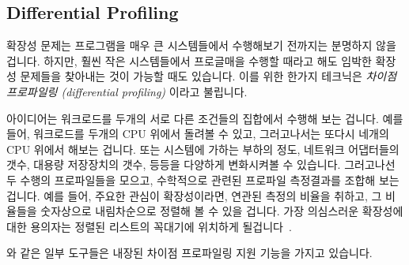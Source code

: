 \subsection{Differential Profiling}
\label{sec:debugging:Differential Profiling}

확장성 문제는 프로그램을 매우 큰 시스템들에서 수행해보기 전까지는 분명하지 않을
겁니다.
하지만, 훨씬 작은 시스템들에서 프로글매을 수행할 때라고 해도 임박한 확장성
문제들을 찾아내는 것이 가능할 때도 있습니다.
이를 위한 한가지 테크닉은 \emph{차이점 프로파일링 (differential profiling)}
이라고 불립니다.

아이디어는 워크로드를 두개의 서로 다른 조건들의 집합에서 수행해 보는 겁니다.
예를들어, 워크로드를 두개의 CPU 위에서 돌려볼 수 있고, 그러고나서는 또다시
네개의 CPU 위에서 해보는 겁니다.
또는 시스템에 가하는 부하의 정도, 네트워크 어댑터들의 갯수, 대용량 저장장치의
갯수, 등등을 다양하게 변화시켜볼 수 있습니다.
그러고나선 두 수행의 프로파일들을 모으고, 수학적으로 관련된 프로파일 측정결과를
조합해 보는 겁니다.
예를 들어, 주요한 관심이 확장성이라면, 연관된 측정의 비율을 취하고, 그 비율들을
숫자상으로 내림차순으로 정렬해 볼 수 있을 겁니다.
가장 의심스러운 확장성에 대한 용의자는 정렬된 리스트의 꼭대기에 위치하게
될겁니다~\cite{McKenney95a,McKenney99b}.

 와 같은 일부 도구들은 내장된 차이점 프로파일링 지원 기능을 가지고
있습니다.

